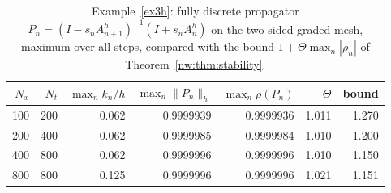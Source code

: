 \begin{table}[htbp]
\centering
\footnotesize
\caption{Example~\ref{ex3h}: fully discrete propagator $P_n=(I-s_nA_{n+1}^h)^{-1}(I+s_nA_n^h)$ on the two-sided graded mesh, maximum over all steps, compared with the bound $1+\Theta\max_n|\rho_n|$ of Theorem~\ref{nw:thm:stability}.}
\label{tab:propagator}
\begin{tabular}{rrrrrrr}
\toprule
$N_x$ & $N_t$ & $\max_nk_n/h$ & $\max_n\|P_n\|_h$ & $\max_n\rho(P_n)$ & $\Theta$ & bound \\
\midrule
100 & 200 & 0.062 & 0.9999939 & 0.9999936 & 1.011 & 1.270 \\
200 & 400 & 0.062 & 0.9999985 & 0.9999984 & 1.010 & 1.200 \\
400 & 800 & 0.062 & 0.9999996 & 0.9999996 & 1.010 & 1.150 \\
800 & 800 & 0.125 & 0.9999996 & 0.9999996 & 1.021 & 1.151 \\
\bottomrule
\end{tabular}
\end{table}
